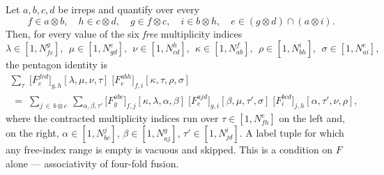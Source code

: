 \documentclass[11pt,a4paper]{article}
\theoremstyle{plain}
\theoremstyle{definition}
\begin{document}
Let $a,b,c,d$ be irreps and quantify over every
\[
  f\in a\otimes b,\quad h\in c\otimes d,\quad g\in f\otimes c,\quad
  i\in b\otimes h,\quad e\in (g\otimes d)\cap(a\otimes i).
\]
Then, for every value of the six \emph{free} multiplicity indices
\[
  \lambda\in[1,N^g_{fc}],\ \ \mu\in[1,N^e_{gd}],\ \ \nu\in[1,N^h_{cd}],\ \
  \kappa\in[1,N^f_{ab}],\ \ \rho\in[1,N^i_{bh}],\ \ \sigma\in[1,N^e_{ai}],
\]
the pentagon identity is
\begin{multline}\label{eq:pentagon}
  \sum_{\tau}\;
    \bigl[F^{fcd}_{e}\bigr]_{g,h}[\lambda,\mu,\nu,\tau]\;
    \bigl[F^{abh}_{e}\bigr]_{f,i}[\kappa,\tau,\rho,\sigma]
  \\[0.3em]
  \;=\;
  \sum_{j\,\in\, b\otimes c}\ \sum_{\alpha,\beta,\tau'}
    \bigl[F^{abc}_{g}\bigr]_{f,j}[\kappa,\lambda,\alpha,\beta]\;
    \bigl[F^{ajd}_{e}\bigr]_{g,i}[\beta,\mu,\tau',\sigma]\;
    \bigl[F^{bcd}_{i}\bigr]_{j,h}[\alpha,\tau',\nu,\rho] ,
\end{multline}
where the contracted multiplicity indices run over
$\tau\in[1,N^e_{fh}]$ on the left and, on the right,
$\alpha\in[1,N^j_{bc}]$, $\beta\in[1,N^g_{aj}]$, $\tau'\in[1,N^i_{jd}]$. A
label tuple for which any free-index range is empty is vacuous and skipped.
This is a condition on $F$ alone --- associativity of four-fold fusion.
\end{document}
